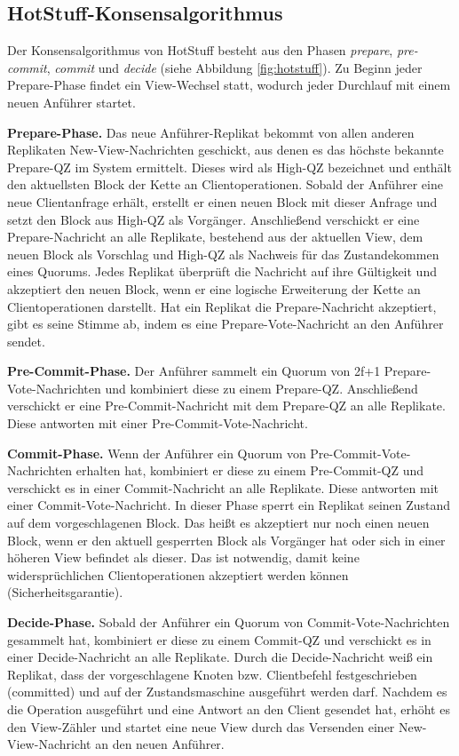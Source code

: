 \documentclass[nonacm,sigconf,natbib=false]{acmart}
\begin{document}
\subsection{HotStuff-Konsensalgorithmus}

Der Konsensalgorithmus von HotStuff besteht aus den Phasen \emph{prepare}, \emph{pre-commit}, \emph{commit} und \emph{decide} (siehe Abbildung \ref{fig:hotstuff}). Zu Beginn jeder Prepare-Phase findet ein View-Wechsel statt, wodurch jeder Durchlauf mit einem neuen Anführer startet.

\textbf{Prepare-Phase.} Das neue Anführer-Replikat bekommt von allen anderen Replikaten New-View-Nachrichten geschickt, aus denen es das höchste bekannte Prepare-QZ im System ermittelt. Dieses wird als High-QZ bezeichnet und enthält den aktuellsten Block der Kette an Clientoperationen. Sobald der Anführer eine neue Clientanfrage erhält, erstellt er einen neuen Block mit dieser Anfrage und setzt den Block aus High-QZ als Vorgänger. Anschließend verschickt er eine Prepare-Nachricht an alle Replikate, bestehend aus der aktuellen View, dem neuen Block als Vorschlag und High-QZ als Nachweis für das Zustandekommen eines Quorums. Jedes Replikat überprüft die Nachricht auf ihre Gültigkeit und akzeptiert den neuen Block, wenn er eine logische Erweiterung der Kette an Clientoperationen darstellt. Hat ein Replikat die Prepare-Nachricht akzeptiert, gibt es seine Stimme ab, indem es eine Prepare-Vote-Nachricht an den Anführer sendet.

\textbf{Pre-Commit-Phase.} Der Anführer sammelt ein Quorum von 2f+1 Prepare-Vote-Nachrichten und kombiniert diese zu einem Prepare-QZ. Anschließend verschickt er eine Pre-Commit-Nachricht mit dem Prepare-QZ an alle Replikate. Diese antworten mit einer Pre-Commit-Vote-Nachricht.

\textbf{Commit-Phase.} Wenn der Anführer ein Quorum von Pre-Commit-Vote-Nachrichten erhalten hat, kombiniert er diese zu einem Pre-Commit-QZ und verschickt es in einer Commit-Nachricht an alle Replikate. Diese antworten mit einer Commit-Vote-Nachricht. In dieser Phase sperrt ein Replikat seinen Zustand auf dem vorgeschlagenen Block. Das heißt es akzeptiert nur noch einen neuen Block, wenn er den aktuell gesperrten Block als Vorgänger hat oder sich in einer höheren View befindet als dieser. Das ist notwendig, damit keine widersprüchlichen Clientoperationen akzeptiert werden können (Sicherheitsgarantie).

\textbf{Decide-Phase.} Sobald der Anführer ein Quorum von Commit-Vote-Nachrichten gesammelt hat, kombiniert er diese zu einem Commit-QZ und verschickt es in einer Decide-Nachricht an alle Replikate. Durch die Decide-Nachricht weiß ein Replikat, dass der vorgeschlagene Knoten bzw. Clientbefehl festgeschrieben (committed) und auf der Zustandsmaschine ausgeführt werden darf. Nachdem es die Operation ausgeführt und eine Antwort an den Client gesendet hat, erhöht es den View-Zähler und startet eine neue View durch das Versenden einer New-View-Nachricht an den neuen Anführer.
\end{document}
